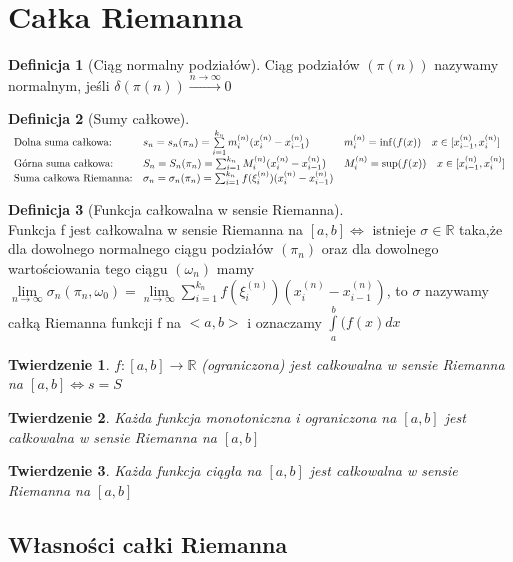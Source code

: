 \documentclass[12pt,a4paper]{article}
\newtheorem{tw}{Twierdzenie}
\theoremstyle{definition}
\newtheorem{df}{Definicja}
\begin{document}
\section{Całka Riemanna}
\begin{df}[Ciąg normalny podziałów]
Ciąg podziałów $(\pi(n))$ nazywamy normalnym, jeśli $\delta (\pi (n)) \xrightarrow{n\to\infty}0$
\end{df}
\begin{df}[Sumy całkowe]~\\
$\begin{array}{l l l}
\text{Dolna suma całkowa:}& s_n = s_n(\pi_n) = \sum \limits_{i=1}^{k_n}m_i^{(n)}
(x_i^{(n)}-x_{i-1}^{(n)}) & m_i^{(n)} =
 \inf (f(x)) \quad x\in [x_{i-1}^{(n)} ,x_{i}^{(n)} ]\\
\text{Górna suma całkowa:}& S_n = S_n(\pi_n) = \sum_{i=1}^{k_n}M_i^{(n)}(x_i^{(n)}-x_{i-1}^{(n)}) & M_i^{(n)} = \sup (f(x)) \quad x\in [x_{i-1}^{(n)},x_{i}^{(n)}]\\
\text{Suma całkowa Riemanna:}& \sigma_n = \sigma_n(\pi_n) = \sum_{i=1}^{k_n}f(\xi_i^{(n)})(x_i^{(n)}-x_{i-1}^{(n)})
\end{array}$
\end{df}
\begin{df}[Funkcja całkowalna w sensie Riemanna]~\\
Funkcja f jest całkowalna w sensie Riemanna na $[a,b] \Leftrightarrow$ istnieje $\sigma\in\mathbb{R}$ taka,że dla dowolnego normalnego ciągu podziałów $(\pi_n)$ oraz dla dowolnego wartościowania tego ciągu $(\omega_n)$ mamy $\lim\limits_{n\to\infty}\sigma_n(\pi_n,\omega_0) = \lim\limits_{n\to\infty}\sum\limits_{i=1}^{k_n}f(\xi_i^{(n)})(x_i^{(n)}-x_{i-1}^{(n)})$, to $\sigma$ nazywamy całką Riemanna funkcji f na $<a,b>$ i oznaczamy $\int\limits_a^b(f(x)dx$
\end{df}
\begin{tw}
$f: [a,b] \rightarrow \mathbb{R}$ (ograniczona) jest całkowalna w sensie Riemanna na $[a,b] \Leftrightarrow s=S$
\end{tw}
\begin{tw}
Każda funkcja monotoniczna i ograniczona na $[a,b]$ jest całkowalna w sensie Riemanna na $[a,b]$
\end{tw}
\begin{tw}
Każda funkcja ciągła na $[a,b]$ jest całkowalna w sensie Riemanna na $[a,b]$
\end{tw}

\subsection{Własności całki Riemanna}
\end{document}

